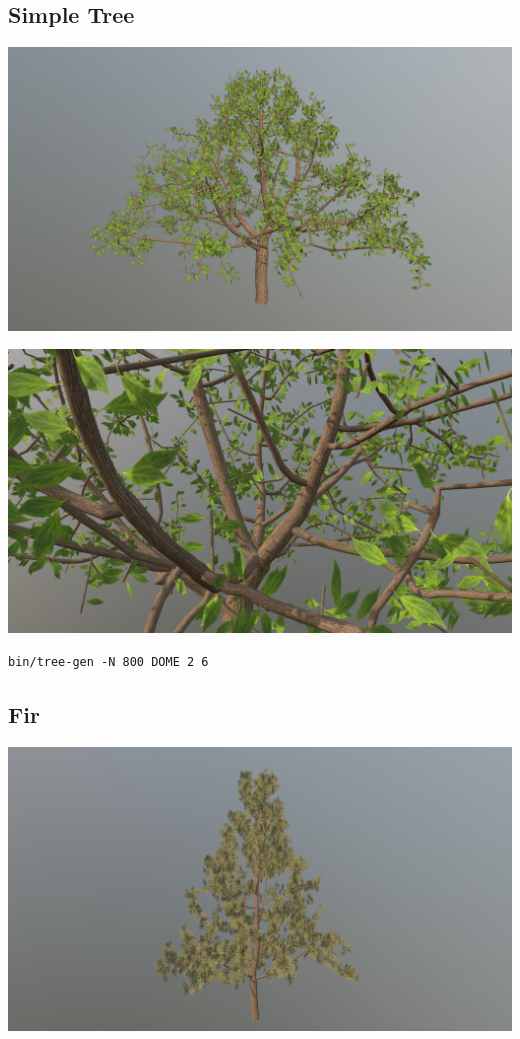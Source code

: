 \documentclass[10pt,a4paper]{article}
\begin{document}
\subsection{Simple Tree}

\begin{center}
\includegraphics[scale=.17]{simple.png}
\end{center}

\begin{center}
\includegraphics[scale=.17]{simple_detail.png}
\end{center}

\texttt{bin/tree-gen -N 800 DOME 2 6}

\subsection{Fir}

\begin{center}
\includegraphics[scale=.17]{fir.png}
\end{center}
\end{document}
